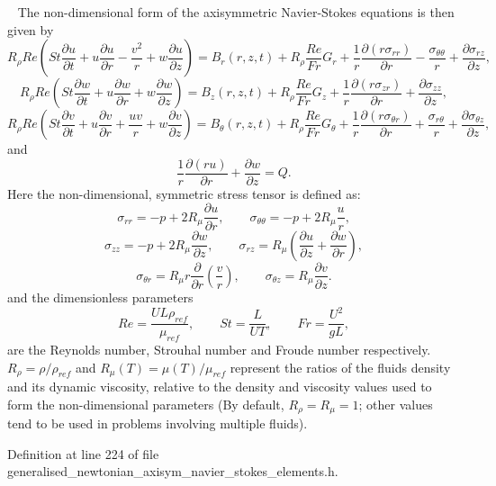 ~\newline
The non-\/dimensional form of the axisymmetric Navier-\/\+Stokes equations is then given by \[ R_{\rho} Re\left(St\frac{\partial u}{\partial t} + {u}\frac{\partial u}{\partial r} - \frac{{v}^2}{r} + {w}\frac{\partial u}{\partial z} \right) = B_r\left(r,z,t\right)+ R_\rho \frac{Re}{Fr} G_r + \frac{1}{r} \frac{\partial\left({r}\sigma_{rr}\right)}{\partial r} - \frac{\sigma_{\theta\theta}}{r} + \frac{\partial\sigma_{rz}}{\partial z}, \] \[ R_{\rho} Re\left(St\frac{\partial w}{\partial t} + {u}\frac{\partial w}{\partial r} + {w}\frac{\partial w}{\partial z} \right) = B_z\left(r,z,t\right)+ R_\rho \frac{Re}{Fr} G_z+ \frac{1}{r}\frac{\partial\left({r}\sigma_{zr}\right)}{\partial r} + \frac{\partial\sigma_{zz}}{\partial z}, \] \[ R_{\rho} Re\left(St\frac{\partial v}{\partial t} + {u}\frac{\partial v}{\partial r} + \frac{u v}{r} +{w}\frac{\partial v}{\partial z} \right)= B_\theta\left(r,z,t\right)+ R_\rho \frac{Re}{Fr} G_\theta+ \frac{1}{r}\frac{\partial\left({r}\sigma_{\theta r}\right)}{\partial r} + \frac{\sigma_{r\theta}}{r} + \frac{\partial\sigma_{\theta z}}{\partial z}, \] and \[ \frac{1}{r}\frac{\partial\left(ru\right)}{\partial r} + \frac{\partial w}{\partial z} = Q. \] Here the non-\/dimensional, symmetric stress tensor is defined as\+: \[ \sigma_{rr} = -p + 2R_\mu \frac{\partial u}{\partial r}, \qquad \sigma_{\theta\theta} = -p +2R_\mu \frac{u}{r}, \] \[ \sigma_{zz} = -p + 2R_\mu \frac{\partial w}{\partial z}, \qquad \sigma_{rz} = R_\mu \left(\frac{\partial u}{\partial z} + \frac{\partial w}{\partial r}\right), \] \[ \sigma_{\theta r} = R_\mu r \frac{\partial}{\partial r}\left(\frac{v}{r}\right), \qquad \sigma_{\theta z} = R_\mu \frac{\partial v}{\partial z}. \] and the dimensionless parameters \[ Re = \frac{UL\rho_{ref}}{\mu_{ref}}, \qquad St = \frac{L}{UT}, \qquad Fr = \frac{U^2}{gL}, \] are the Reynolds number, Strouhal number and Froude number respectively. $ R_\rho=\rho/\rho_{ref} $ and $ R_\mu(T) =\mu(T)/\mu_{ref}$ represent the ratios of the fluid\textquotesingle{}s density and its dynamic viscosity, relative to the density and viscosity values used to form the non-\/dimensional parameters (By default, $ R_\rho = R_\mu = 1 $; other values tend to be used in problems involving multiple fluids). 

Definition at line 224 of file generalised\+\_\+newtonian\+\_\+axisym\+\_\+navier\+\_\+stokes\+\_\+elements.\+h.



